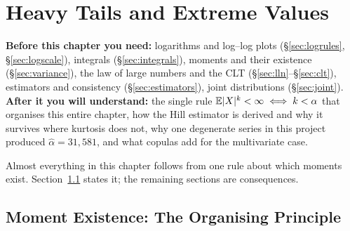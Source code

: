 \chapter{Heavy Tails and Extreme Values}
\label{ch:heavytails}

\begin{tcolorbox}[feynbox={Sky}{BBg},title={Before and After}]
\textbf{Before this chapter you need:} logarithms and log--log plots
(\S\ref{sec:logrules}, \S\ref{sec:logscale}), integrals
(\S\ref{sec:integrals}), moments and their existence
(\S\ref{sec:variance}), the law of large numbers and the CLT
(\S\ref{sec:lln}--\S\ref{sec:clt}), estimators and consistency
(\S\ref{sec:estimators}), joint distributions (\S\ref{sec:joint}).\\
\textbf{After it you will understand:} the single rule
$\mathbb{E}|X|^k < \infty \iff k < \alpha$ that organises this entire chapter, how the
Hill estimator is derived and why it survives where kurtosis does not, why one
degenerate series in this project produced $\hat\alpha = 31{,}581$, and what
copulas add for the multivariate case.
\end{tcolorbox}

Almost everything in this chapter follows from one rule about which moments
exist. Section~\ref{sec:moments} states it; the remaining sections are
consequences.

\section{Moment Existence: The Organising Principle}
\label{sec:moments}




